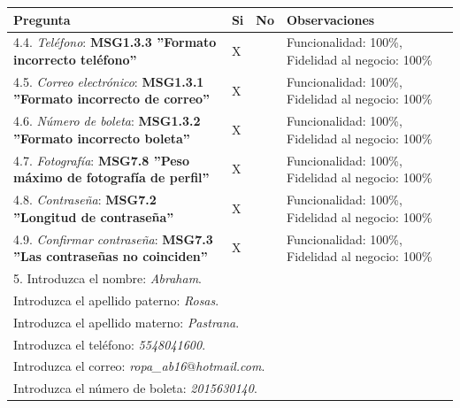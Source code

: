 \documentclass[oneside,10pt]{book}
\begin{document}
\begin{tabularx}{\textwidth}{ X l l X }
\hline
\multicolumn{1}{|X|}{Pregunta}                               & \multicolumn{1}{l|}{Si} & \multicolumn{1}{l|}{No} & \multicolumn{1}{X|}{Observaciones} \\ \hline

\multicolumn{1}{|X|}{4.4. \textit{Teléfono}: \textbf{MSG1.3.3 ''Formato incorrecto teléfono''}} & \multicolumn{1}{l|}{X}   & \multicolumn{1}{l|}{}   & \multicolumn{1}{X|}{Funcionalidad: 100\%, Fidelidad al negocio: 100\%}              \\ \hline
\multicolumn{1}{|X|}{4.5. \textit{Correo electrónico}: \textbf{MSG1.3.1 ''Formato incorrecto de correo''}} & \multicolumn{1}{l|}{X}   & \multicolumn{1}{l|}{}   & \multicolumn{1}{X|}{Funcionalidad: 100\%, Fidelidad al negocio: 100\%}              \\ \hline
\multicolumn{1}{|X|}{4.6. \textit{Número de boleta}: \textbf{MSG1.3.2 ''Formato incorrecto boleta''}} & \multicolumn{1}{l|}{X}   & \multicolumn{1}{l|}{}   & \multicolumn{1}{X|}{Funcionalidad: 100\%, Fidelidad al negocio: 100\%}              \\ \hline
\multicolumn{1}{|X|}{4.7. \textit{Fotografía}: \textbf{MSG7.8 ''Peso máximo de fotografía de perfil''}} & \multicolumn{1}{l|}{X}   & \multicolumn{1}{l|}{}   & \multicolumn{1}{X|}{Funcionalidad: 100\%, Fidelidad al negocio: 100\%}              \\ \hline
\multicolumn{1}{|X|}{4.8. \textit{Contraseña}: \textbf{MSG7.2 ''Longitud de contraseña''}} & \multicolumn{1}{l|}{X}   & \multicolumn{1}{l|}{}   & \multicolumn{1}{X|}{Funcionalidad: 100\%, Fidelidad al negocio: 100\%}              \\ \hline
\multicolumn{1}{|X|}{4.9. \textit{Confirmar contraseña}: \textbf{MSG7.3 ''Las contraseñas no coinciden''}} & \multicolumn{1}{l|}{X}   & \multicolumn{1}{l|}{}   & \multicolumn{1}{X|}{Funcionalidad: 100\%, Fidelidad al negocio: 100\%}              \\ \hline

\multicolumn{4}{|l|}{5. Introduzca el nombre: \textit{Abraham}.}              \\
\multicolumn{4}{|l|}{Introduzca el apellido paterno: \textit{Rosas}.}              \\
\multicolumn{4}{|l|}{Introduzca el apellido materno: \textit{Pastrana}.}              \\
\multicolumn{4}{|l|}{Introduzca el teléfono: \textit{5548041600}.}              \\
\multicolumn{4}{|l|}{Introduzca el correo: \textit{ropa\_ab16$@$hotmail.com}.}              \\
\multicolumn{4}{|l|}{Introduzca el número de boleta: \textit{2015630140}.}              \\


\end{tabularx}
\end{document}
